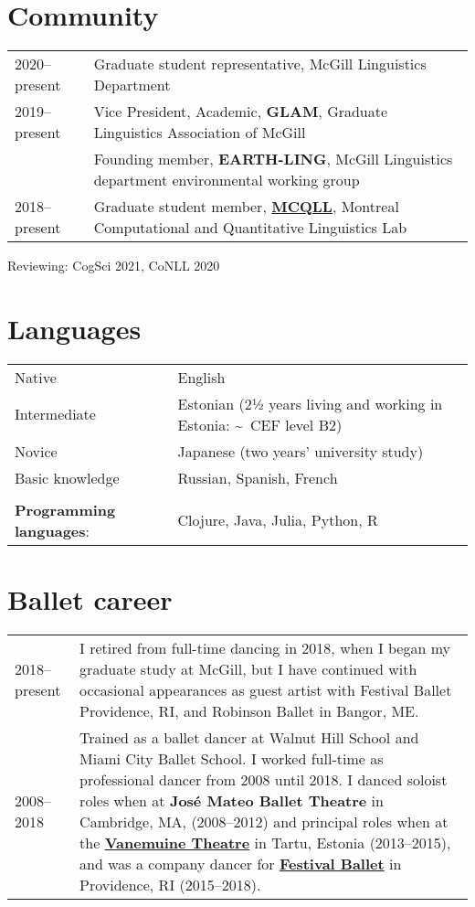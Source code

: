 \documentclass[11pt,a4paper]{article}
\begin{document}
\section{Community} 
\begin{longtable}{p{2cm}|p{14.5cm}}
\textsc{2020--}present  &Graduate student representative, McGill Linguistics Department\\
\textsc{2019--}present	&Vice President, Academic, \textbf{GLAM}, Graduate Linguistics Association of McGill\\
						&Founding member, \textbf{EARTH-LING}, McGill Linguistics department environmental working group\\
\textsc{2018--}present	&Graduate student member, \href{http://mcqll.org}{\textbf{MCQLL}}, Montreal Computational and Quantitative Linguistics Lab\\
\end{longtable}
Reviewing: CogSci 2021, CoNLL 2020
\section{Languages} 

\begin{tabular}{ll}
Native&English\\
Intermediate&Estonian (2½ years living and working in Estonia: \textasciitilde \ CEF level B2)\\
Novice&Japanese (two years' university study)\\
Basic knowledge&Russian, Spanish, French\\
\multicolumn{2}{c}{}\\
\textbf{Programming languages}:&Clojure, Java, Julia, Python, R
\end{tabular}

\section{Ballet career}
\begin{longtable}{p{2cm}|p{14.5cm}}
2018--present & I retired from full-time dancing in 2018, when I began my graduate study at McGill, but I have continued with occasional appearances as guest artist with Festival Ballet Providence, RI, and Robinson Ballet in Bangor, ME.\\
\textsc{2008--2018} & Trained as a ballet dancer at Walnut Hill School and Miami City Ballet School. I worked full-time as professional dancer from 2008 until 2018. I danced soloist roles when at \textbf{José Mateo Ballet Theatre} in Cambridge, MA, (2008--2012) and principal roles when at the \href{http://vanemuine.ee}{\textbf{Vanemuine Theatre}} in Tartu, Estonia (2013--2015), and was a company dancer for \href{http://festivalballetprovidence.org}{\textbf{Festival Ballet}} in Providence, RI (2015--2018).\\
\end{longtable}
\end{document}
